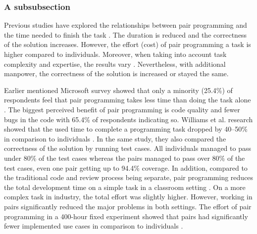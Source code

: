 \documentclass[conference]{IEEEtran}
\begin{document}
\subsubsection{A subsubsection}

Previous studies have explored the relationships between pair programming and the time needed to finish the task \cite{10.1145/1414004.1414026, 10.5555/377517.377531, Arisholm2007Evaluating}. The duration is reduced and the correctness of the solution increases. However, the effort (cost) of pair programming a task is higher compared to individuals. Moreover, when taking into account task complexity and expertise, the results vary \cite{Arisholm2007Evaluating}. Nevertheless, with additional manpower, the correctness of the solution is increased or stayed the same.

Earlier mentioned Microsoft survey showed that only a minority (25.4\%) of respondents feel that pair programming takes less time than doing the task alone \cite{10.1145/1414004.1414026}. The biggest perceived benefit of pair programming is code quality and fewer bugs in the code with 65.4\% of respondents indicating so. Williams et al. research showed that the used time to complete a programming task dropped by 40--50\% in comparison to individuals \cite{Williams2000Strengthening}. In the same study, they also compared the correctness of the solution by running test cases. All individuals managed to pass under 80\% of the test cases whereas the pairs managed to pass over 80\% of the test cases, even one pair getting up to 94.4\% coverage. In addition, compared to the traditional code and review process being separate, pair programming reduces the total development time on a simple task in a classroom setting \cite{10.1145/1159733.1159749}. On a more complex task in industry, the total effort was slightly higher. However, working in pairs significantly reduced the major problems in both settings. The effort of pair programming in a 400-hour fixed experiment showed that pairs had significantly fewer implemented use cases in comparison to individuals \cite{1541842}.
\end{document}
